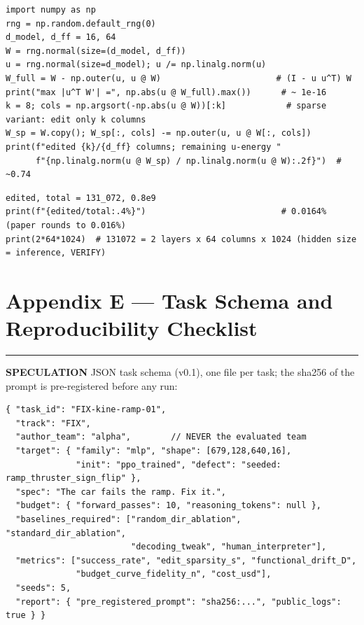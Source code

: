 \documentclass[11pt,a4paper]{article}
\newcommand{\bX}{\textcolor{wspred}{\rule[0.12ex]{1.5mm}{1.5mm}}\;\textcolor{wspred}{\textbf{SPECULATION}}}
\begin{document}
\begin{lstlisting}[caption={lab/02\_direction\_surgery.py --- remove one direction from an MLP output matrix.}]
import numpy as np
rng = np.random.default_rng(0)
d_model, d_ff = 16, 64
W = rng.normal(size=(d_model, d_ff))
u = rng.normal(size=d_model); u /= np.linalg.norm(u)
W_full = W - np.outer(u, u @ W)                       # (I - u u^T) W
print("max |u^T W'| =", np.abs(u @ W_full).max())      # ~ 1e-16
k = 8; cols = np.argsort(-np.abs(u @ W))[:k]            # sparse variant: edit only k columns
W_sp = W.copy(); W_sp[:, cols] -= np.outer(u, u @ W[:, cols])
print(f"edited {k}/{d_ff} columns; remaining u-energy "
      f"{np.linalg.norm(u @ W_sp) / np.linalg.norm(u @ W):.2f}")  # ~0.74
\end{lstlisting}

\begin{lstlisting}[caption={lab/03\_blast\_radius.py --- the sparsity arithmetic of the flagship edit.}]
edited, total = 131_072, 0.8e9
print(f"{edited/total:.4%}")                           # 0.0164%  (paper rounds to 0.016%)
print(2*64*1024)  # 131072 = 2 layers x 64 columns x 1024 (hidden size = inference, VERIFY)
\end{lstlisting}

\section{Appendix E --- Task Schema and Reproducibility Checklist}\label{app:bench}

\bX\; JSON task schema (v0.1), one file per task; the sha256 of the prompt is pre-registered before any run:

\begin{lstlisting}[language={},caption={Task schema, condensed.}]
{ "task_id": "FIX-kine-ramp-01",
  "track": "FIX",
  "author_team": "alpha",        // NEVER the evaluated team
  "target": { "family": "mlp", "shape": [679,128,640,16],
              "init": "ppo_trained", "defect": "seeded: ramp_thruster_sign_flip" },
  "spec": "The car fails the ramp. Fix it.",
  "budget": { "forward_passes": 10, "reasoning_tokens": null },
  "baselines_required": ["random_dir_ablation", "standard_dir_ablation",
                         "decoding_tweak", "human_interpreter"],
  "metrics": ["success_rate", "edit_sparsity_s", "functional_drift_D",
              "budget_curve_fidelity_n", "cost_usd"],
  "seeds": 5,
  "report": { "pre_registered_prompt": "sha256:...", "public_logs": true } }
\end{lstlisting}
\end{document}
